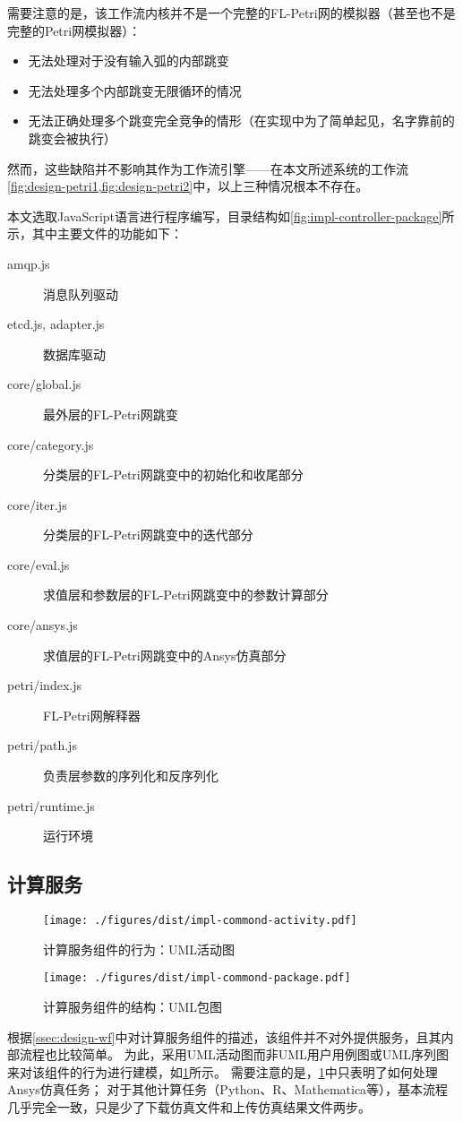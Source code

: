 \documentclass[index]{subfiles}
\begin{document}
需要注意的是，该工作流内核并不是一个完整的FL-Petri网的模拟器（甚至也不是完整的Petri网模拟器）：
\begin{itemize}
  \item 无法处理对于没有输入弧的内部跳变
  \item 无法处理多个内部跳变无限循环的情况
  \item 无法正确处理多个跳变完全竞争的情形（在实现中为了简单起见，名字靠前的跳变会被执行）
\end{itemize}
然而，这些缺陷并不影响其作为工作流引擎——在本文所述系统的工作流\cref{fig:design-petri1,fig:design-petri2}中，以上三种情况根本不存在。

本文选取JavaScript语言进行程序编写，目录结构如\cref{fig:impl-controller-package}所示，其中主要文件的功能如下：
\begin{description}
  \item[amqp.js] 消息队列驱动
  \item[etcd.js, adapter.js] 数据库驱动
  \item[core/global.js] 最外层的FL-Petri网跳变
  \item[core/category.js] 分类层的FL-Petri网跳变中的初始化和收尾部分
  \item[core/iter.js] 分类层的FL-Petri网跳变中的迭代部分
  \item[core/eval.js] 求值层和参数层的FL-Petri网跳变中的参数计算部分
  \item[core/ansys.js] 求值层的FL-Petri网跳变中的Ansys仿真部分
  \item[petri/index.js] FL-Petri网解释器
  \item[petri/path.js] 负责层参数的序列化和反序列化
  \item[petri/runtime.js] 运行环境
\end{description}

\subsection{计算服务}
\begin{figure}[h]
  \centering
  \texttt{[image: ./figures/dist/impl-commond-activity.pdf]}
  \caption{计算服务组件的行为：UML活动图\label{fig:impl-commond-activity}}
\end{figure}
\begin{figure}[h]
  \centering
  \texttt{[image: ./figures/dist/impl-commond-package.pdf]}
  \caption{计算服务组件的结构：UML包图\label{fig:impl-commond-package}}
\end{figure}
根据\cref{ssec:design-wf}中对计算服务组件的描述，该组件并不对外提供服务，且其内部流程也比较简单。
为此，采用UML活动图而非UML用户用例图或UML序列图来对该组件的行为进行建模，如\cref{fig:impl-commond-activity}所示。
需要注意的是，\cref{fig:impl-commond-activity}中只表明了如何处理Ansys仿真任务；
对于其他计算任务（Python、R、Mathematica等），基本流程几乎完全一致，只是少了下载仿真文件和上传仿真结果文件两步。
\end{document}
